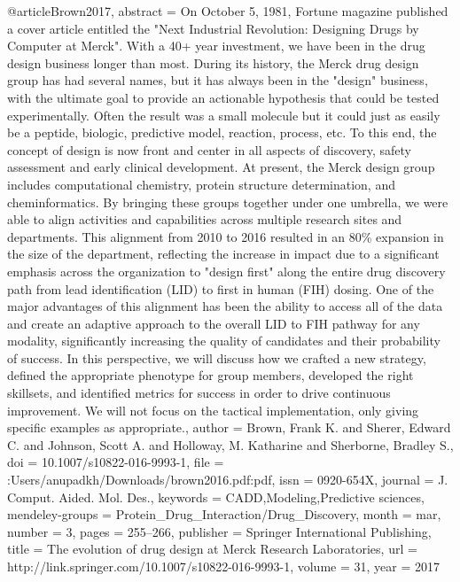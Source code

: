 @article{Brown2017,
abstract = {On October 5, 1981, Fortune magazine published a cover article entitled the "Next Industrial Revolution: Designing Drugs by Computer at Merck". With a 40+ year investment, we have been in the drug design business longer than most. During its history, the Merck drug design group has had several names, but it has always been in the "design" business, with the ultimate goal to provide an actionable hypothesis that could be tested experimentally. Often the result was a small molecule but it could just as easily be a peptide, biologic, predictive model, reaction, process, etc. To this end, the concept of design is now front and center in all aspects of discovery, safety assessment and early clinical development. At present, the Merck design group includes computational chemistry, protein structure determination, and cheminformatics. By bringing these groups together under one umbrella, we were able to align activities and capabilities across multiple research sites and departments. This alignment from 2010 to 2016 resulted in an 80{\%} expansion in the size of the department, reflecting the increase in impact due to a significant emphasis across the organization to "design first" along the entire drug discovery path from lead identification (LID) to first in human (FIH) dosing. One of the major advantages of this alignment has been the ability to access all of the data and create an adaptive approach to the overall LID to FIH pathway for any modality, significantly increasing the quality of candidates and their probability of success. In this perspective, we will discuss how we crafted a new strategy, defined the appropriate phenotype for group members, developed the right skillsets, and identified metrics for success in order to drive continuous improvement. We will not focus on the tactical implementation, only giving specific examples as appropriate.},
author = {Brown, Frank K. and Sherer, Edward C. and Johnson, Scott A. and Holloway, M. Katharine and Sherborne, Bradley S.},
doi = {10.1007/s10822-016-9993-1},
file = {:Users/anupadkh/Downloads/brown2016.pdf:pdf},
issn = {0920-654X},
journal = {J. Comput. Aided. Mol. Des.},
keywords = {CADD,Modeling,Predictive sciences},
mendeley-groups = {Protein{\_}Drug{\_}Interaction/Drug{\_}Discovery},
month = {mar},
number = {3},
pages = {255--266},
publisher = {Springer International Publishing},
title = {{The evolution of drug design at Merck Research Laboratories}},
url = { http://link.springer.com/10.1007/s10822-016-9993-1},
volume = {31},
year = {2017}
}
